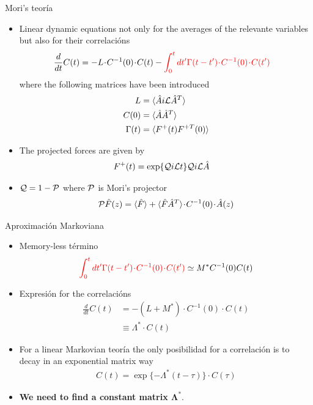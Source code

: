 \documentclass{beamer}
\newcommand{\esc}{\!\cdot\!}
\begin{document}
\begin{frame}{Mori's teoría}
  \begin{itemize}
    \item<1-> Linear dynamic equations not only for the averages of the relevante variables but also for their correlacións
\begin{align}
  \frac{d}{dt}C(t)&=-L\esc C^{-1}(0)\esc C(t)
  -{\color{red}\int_0^tdt' \Gamma(t-t')\esc C^{-1}(0)\esc  C(t')}
\nonumber
\end{align}
where the following matrices have been introduced
\begin{align}
  L&=\langle \hat{A}i{\cal L}\hat{A}^T\rangle \nonumber \\
  C(0)&=\langle \hat{A}\hat{A}^T\rangle \nonumber \\
\Gamma(t)&=\langle F^+(t)F^{+T}(0)\rangle
\nonumber
\end{align}
\item<2-> The projected forces are given by
\begin{align}
F^+(t)&= \exp\{{\cal Q}i{\cal L}t\} {\cal Q}i{\cal L}\hat{A}  
\nonumber
\end{align}
\item<3-> ${\cal Q}=1-{\cal P}$ where  ${\cal P}$  is Mori's  projector 
\begin{align}
  {\cal P}\hat{F}(z) = \langle \hat{F}\rangle+ \langle \hat{F}\hat{A}^T \rangle\esc  C^{-1}(0)\esc  \hat{A}(z)
\nonumber
\end{align}
\end{itemize}
\end{frame}

\begin{frame}{Aproximación Markoviana}
  \begin{itemize}
    \item Memory-less término 
  \begin{align}
{\color{red}\int_0^tdt' \Gamma(t-t')\esc C^{-1}(0)\esc  C(t')} \simeq M^* C^{-1}(0)C(t)
\nonumber
\end{align}
\item Expresión for the correlacións
\begin{align}
  \frac{d}{dt}C(t) &= - (L+M^*)\esc C^{-1}(0)\esc C(t) \nonumber \\
                     &\equiv \Lambda^*\esc C(t)
  \nonumber
\end{align}
\item For a linear Markovian teoría the only posibilidad for a correlación is to decay in an exponential matrix way
\begin{align}
  C(t)=\exp\{-\Lambda^* (t-\tau)\}\esc C(\tau)
\nonumber
\end{align}
\item {\bf We need to find a constant matrix $\boldsymbol{\Lambda^*}$}.
\end{itemize}
\end{frame}
\end{document}
